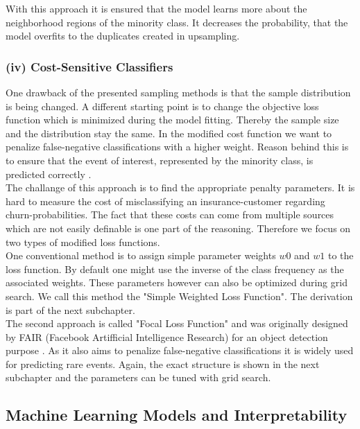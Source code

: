\documentclass[12pt,titlepage]{article}
\begin{document}
With this approach it is ensured that the model learns more about the neighborhood regions of the minority class. It decreases the probability, that the model overfits to the duplicates created in upsampling. \\

\subsubsection*{(iv) Cost-Sensitive Classifiers} \label{Cost-Sensitive Classifiers}
One drawback of the presented sampling methods is that the sample distribution is being changed. A different starting point is to change the objective loss function which is minimized during the model fitting. Thereby the sample size and the distribution stay the same. In the modified cost function we want to penalize false-negative
classifications with a higher weight. Reason behind this is to ensure that the event of interest, represented by the minority class, is predicted correctly \cite{cost_sensitive}. \\
The challange of this approach is to find the appropriate penalty parameters. It is hard to measure the cost of misclassifying an insurance-customer regarding churn-probabilities. The fact that these costs can come from multiple sources which are not easily definable is one part of the reasoning. Therefore we focus on two types of modified loss functions.\\
One conventional method is to assign simple parameter weights $w0$ and $w1$ to the loss function. By default one might use the inverse of the class frequency as the associated weights. These parameters however can also be optimized during grid search. We call this method the "Simple Weighted Loss Function". The derivation is part of the next subchapter.\\
The second approach is called "Focal Loss Function" and was originally designed by FAIR (Facebook Artifficial Intelligence Research) for an object detection purpose \cite{focal}. As it also aims to penalize false-negative classifications it is widely used for predicting rare events. Again, the exact structure is shown in the next subchapter and the parameters can be tuned with grid search.\\


\subsection{Machine Learning Models and Interpretability} \par
\end{document}
